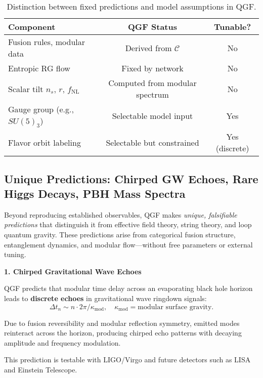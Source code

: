 \documentclass[11pt]{article}
\def\frac#1#2{#1/#2}
\begin{document}
\begin{table}[H]
\centering
\renewcommand{\arraystretch}{1.2}
\begin{tabular}{|l|c|c|}
\hline
\textbf{Component} & \textbf{QGF Status} & \textbf{Tunable?} \\
\hline
Fusion rules, modular data & Derived from \( \mathcal{C} \) & No \\
Entropic RG flow & Fixed by network & No \\
Scalar tilt \( n_s \), \( r \), \( f_{\text{NL}} \) & Computed from modular spectrum & No \\
Gauge group (e.g., \( SU(5)_3 \)) & Selectable model input & Yes \\
Flavor orbit labeling & Selectable but constrained & Yes (discrete) \\
\hline
\end{tabular}
\caption{Distinction between fixed predictions and model assumptions in QGF.}
\label{tab:derived-vs-selectable}
\end{table}



\subsection{Unique Predictions: Chirped GW Echoes, Rare Higgs Decays, PBH Mass Spectra}

Beyond reproducing established observables, QGF makes \textit{unique, falsifiable predictions} that distinguish it from effective field theory, string theory, and loop quantum gravity. These predictions arise from categorical fusion structure, entanglement dynamics, and modular flow—without free parameters or external tuning.

\vspace{0.5em}
\noindent\textbf{1. Chirped Gravitational Wave Echoes}

QGF predicts that modular time delay across an evaporating black hole horizon leads to \textbf{discrete echoes} in gravitational wave ringdown signals:
\[
\Delta t_n \sim n \cdot \frac{2\pi}{\kappa_{\text{mod}}}, \quad \kappa_{\text{mod}} = \text{modular surface gravity}.
\]

Due to fusion reversibility and modular reflection symmetry, emitted modes reinteract across the horizon, producing chirped echo patterns with decaying amplitude and frequency modulation.

This prediction is testable with LIGO/Virgo and future detectors such as LISA and Einstein Telescope.
\end{document}
